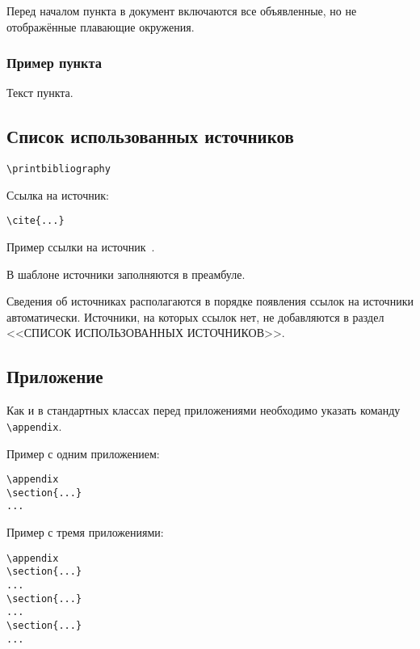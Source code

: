 \documentclass[14pt, a4paper, titlepage]{extarticle}
\renewcommand{\thesection}{\Asbuk{section}}
\let\oldsec\section
\renewcommand{\section}{
        \clearpage
        \phantomsection
        \refstepcounter{section}
        \setcounter{figure}{0} %
        \setcounter{table}{0} %
        \setcounter{equation}{0} %
        \addcontentsline{toc}{section}{\appendixname~\thesection}
        \oldsec*} %
\let\oldprintbibliography\printbibliography
\renewcommand{\printbibliography}{\oldprintbibliography[title={Список использованных источников}]}
\begin{document}
 Перед началом пункта в документ включаются все объявленные, но не отображённые плавающие окружения.

\subsubsection{Пример пункта}

Текст пункта.

\subsection{Список использованных источников}

\begin{verbatim}
\printbibliography
\end{verbatim}

Ссылка на источник:
\begin{verbatim}
\cite{...}
\end{verbatim}

Пример ссылки на источник~\cite{bib:recomendations}.

В шаблоне источники заполняются в преамбуле.

Сведения об источниках располагаются в порядке появления ссылок на источники автоматически. Источники, на которых ссылок нет, не добавляются в раздел \uppercase{<<Список использованных источников>>}.

\subsection{Приложение}

Как и в стандартных классах перед приложениями необходимо указать команду \verb"\appendix".

Пример с одним приложением:
\begin{verbatim}
\appendix
\section{...}
...
\end{verbatim}

Пример с тремя приложениями:
\begin{verbatim}
\appendix
\section{...}
...
\section{...}
...
\section{...}
...
\end{verbatim}
\end{document}
